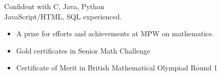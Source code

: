 \smallskip
{}
Confident with C, Java, Python \\
JavaScript/HTML, SQL experienced.


\begin{itemize}
\item A prize for efforts and achievements at MPW on mathematics.
\end{itemize} 

\divider


\begin{itemize}

\item Gold certificates in Senior Math Challenge
\item Certificate of Merit in British Mathematical Olympiad Round 1

\end{itemize} 










